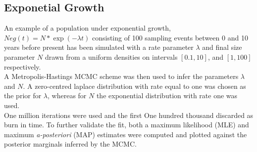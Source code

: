 \documentclass{report}
\theoremstyle{definition}
\begin{document}
\subsection{Exponetial Growth}
An example of a population under exponential growth, $Neg(t) = N*\exp(-\lambda t)$ consisting of 100 sampling events between 0 and 10 years before present has been simulated with a rate parameter $\lambda$ and final size parameter $N$ drawn from a uniform densities on intervals $[0.1, 10]$, and $[1,100]$ respectively.\\
A Metropolis-Hastings MCMC scheme was then used to infer the parameters $\lambda$ and $N$. A zero-centred laplace distribution with rate equal to one was chosen as the prior for $\lambda$, whereas for $N$ the exponential distribution with rate one was used.\\
One million iterations were used and the first One hundred thousand discarded as burn in time. To further validate the fit, both a maximum likelihood (MLE) and maximum \textit{a-posteriori} (MAP) estimates were computed and plotted against the posterior marginals inferred by the MCMC.
\end{document}
